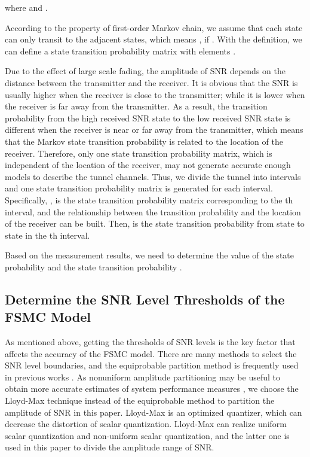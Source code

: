\documentclass[conference]{IEEEtran}
\begin{document}
where  and .

According to the property of first-order Markov chain, we assume that each state can only transit to the adjacent states, which means , if . With the definition, we can define a  state transition probability matrix  with elements .

Due to the effect of large scale fading, the amplitude of SNR depends on the distance between the transmitter and the receiver. It is obvious that the SNR is usually higher when the receiver is close to the transmitter; while it is lower when the receiver is far away from the transmitter. As a result, the transition probability from the high received SNR state to the low received SNR state is different when the receiver is near or far away from the transmitter, which means that the Markov state transition probability is related to the location of  the receiver.
Therefore, only one state transition probability matrix, which is independent of the location of the receiver, may not generate accurate enough models to describe the tunnel channels. Thus, we divide the tunnel into  intervals and one state transition probability matrix is generated for each interval. Specifically, , is the state transition probability matrix corresponding to the th interval, and the relationship between the transition probability and the location of the receiver can be built. Then,  is the state transition probability from state  to state  in the th interval.



Based on the measurement results, we need to determine the value of the state probability  and the state transition probability .






\subsection{Determine the SNR Level Thresholds of the FSMC Model}
As mentioned above, getting the thresholds of SNR levels is the key factor that affects the accuracy  of the FSMC model. There are many methods to select the SNR level boundaries, and the equiprobable partition method is frequently used in previous works \cite{Finite_state_Markov_channel_a_useful_model_for_radio_communication_channels,Finite-state_Markov_modeling_of_correlated_Rician-fading_channels,Fast_simulation_of_diversity_Nakagami_fading_channels_using_finite-state_Markov_models}. As nonuniform amplitude partitioning may be useful to obtain more accurate estimates of system performance measures \cite{Finite-state_Markov_modeling_of_fading_channels_a_survey_of_principles_and_applications}, we choose the Lloyd-Max technique \cite{Least_squares_quantization_in_PCM} instead of the equiprobable method to partition the amplitude of SNR in this paper. Lloyd-Max is an optimized quantizer, which can decrease the distortion of scalar quantization. Lloyd-Max can realize uniform scalar quantization and non-uniform scalar quantization, and the latter one is used in this paper to divide the amplitude range of SNR.
\end{document}
